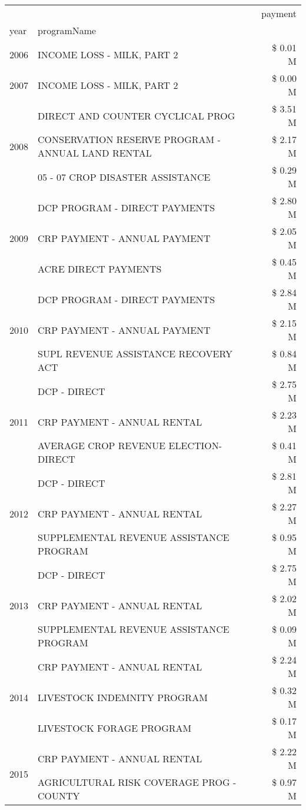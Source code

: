 \begin{tabular}{llr}
\toprule
 &  & payment \\
year & programName &  \\
\midrule
2006 & INCOME LOSS - MILK, PART 2 & \$ 0.01 M \\
\cline{1-3}
2007 & INCOME LOSS - MILK, PART 2 & \$ 0.00 M \\
\cline{1-3}
\multirow[t]{3}{*}{2008} & DIRECT AND COUNTER CYCLICAL PROG & \$ 3.51 M \\
 & CONSERVATION RESERVE PROGRAM - ANNUAL LAND RENTAL & \$ 2.17 M \\
 & 05 - 07 CROP DISASTER ASSISTANCE & \$ 0.29 M \\
\cline{1-3}
\multirow[t]{3}{*}{2009} & DCP PROGRAM - DIRECT PAYMENTS & \$ 2.80 M \\
 & CRP PAYMENT - ANNUAL PAYMENT & \$ 2.05 M \\
 & ACRE DIRECT PAYMENTS & \$ 0.45 M \\
\cline{1-3}
\multirow[t]{3}{*}{2010} & DCP PROGRAM - DIRECT PAYMENTS & \$ 2.84 M \\
 & CRP PAYMENT - ANNUAL PAYMENT & \$ 2.15 M \\
 & SUPL REVENUE ASSISTANCE RECOVERY ACT & \$ 0.84 M \\
\cline{1-3}
\multirow[t]{3}{*}{2011} & DCP - DIRECT & \$ 2.75 M \\
 & CRP PAYMENT - ANNUAL RENTAL & \$ 2.23 M \\
 & AVERAGE CROP REVENUE ELECTION-DIRECT & \$ 0.41 M \\
\cline{1-3}
\multirow[t]{3}{*}{2012} & DCP - DIRECT & \$ 2.81 M \\
 & CRP PAYMENT - ANNUAL RENTAL & \$ 2.27 M \\
 & SUPPLEMENTAL REVENUE ASSISTANCE PROGRAM & \$ 0.95 M \\
\cline{1-3}
\multirow[t]{3}{*}{2013} & DCP - DIRECT & \$ 2.75 M \\
 & CRP PAYMENT - ANNUAL RENTAL & \$ 2.02 M \\
 & SUPPLEMENTAL REVENUE ASSISTANCE PROGRAM & \$ 0.09 M \\
\cline{1-3}
\multirow[t]{3}{*}{2014} & CRP PAYMENT - ANNUAL RENTAL & \$ 2.24 M \\
 & LIVESTOCK INDEMNITY PROGRAM & \$ 0.32 M \\
 & LIVESTOCK FORAGE PROGRAM & \$ 0.17 M \\
\cline{1-3}
\multirow[t]{3}{*}{2015} & CRP PAYMENT - ANNUAL RENTAL & \$ 2.22 M \\
 & AGRICULTURAL RISK COVERAGE PROG - COUNTY & \$ 0.97 M \\

\end{tabular}
